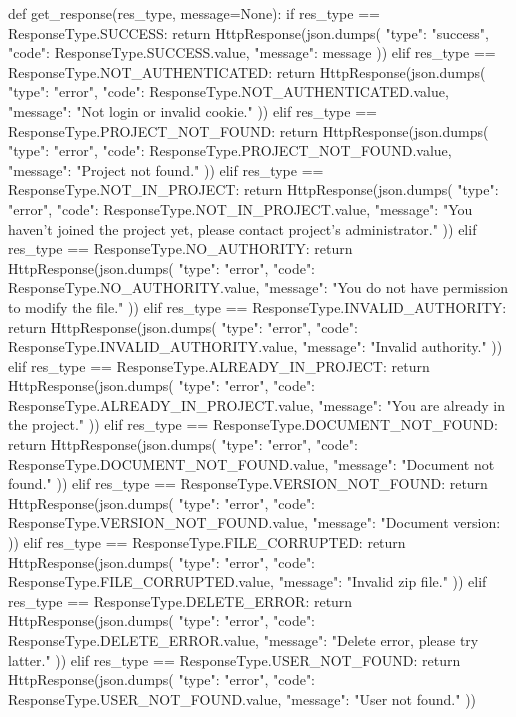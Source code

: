 def get_response(res_type, message=None):
    if res_type == ResponseType.SUCCESS:
        return HttpResponse(json.dumps({
            "type": "success",
            "code": ResponseType.SUCCESS.value,
            "message": message
        }))
    elif res_type == ResponseType.NOT_AUTHENTICATED:
        return HttpResponse(json.dumps({
            "type": "error",
            "code": ResponseType.NOT_AUTHENTICATED.value,
            "message": "Not login or invalid cookie."
        }))
    elif res_type == ResponseType.PROJECT_NOT_FOUND:
        return HttpResponse(json.dumps({
            "type": "error",
            "code": ResponseType.PROJECT_NOT_FOUND.value,
            "message": "Project not found."
        }))
    elif res_type == ResponseType.NOT_IN_PROJECT:
        return HttpResponse(json.dumps({
            "type": "error",
            "code": ResponseType.NOT_IN_PROJECT.value,
            "message": "You haven't joined the project yet, please contact project's administrator."
        }))
    elif res_type == ResponseType.NO_AUTHORITY:
        return HttpResponse(json.dumps({
            "type": "error",
            "code": ResponseType.NO_AUTHORITY.value,
            "message": "You do not have permission to modify the file."
        }))
    elif res_type == ResponseType.INVALID_AUTHORITY:
        return HttpResponse(json.dumps({
            "type": "error",
            "code": ResponseType.INVALID_AUTHORITY.value,
            "message": "Invalid authority."
        }))
    elif res_type == ResponseType.ALREADY_IN_PROJECT:
        return HttpResponse(json.dumps({
            "type": "error",
            "code": ResponseType.ALREADY_IN_PROJECT.value,
            "message": "You are already in the project."
        }))
    elif res_type == ResponseType.DOCUMENT_NOT_FOUND:
        return HttpResponse(json.dumps({
            "type": "error",
            "code": ResponseType.DOCUMENT_NOT_FOUND.value,
            "message": "Document not found."
        }))
    elif res_type == ResponseType.VERSION_NOT_FOUND:
        return HttpResponse(json.dumps({
            "type": "error",
            "code": ResponseType.VERSION_NOT_FOUND.value,
            "message": "Document version: %
        }))
    elif res_type == ResponseType.FILE_CORRUPTED:
        return HttpResponse(json.dumps({
            "type": "error",
            "code": ResponseType.FILE_CORRUPTED.value,
            "message": "Invalid zip file."
        }))
    elif res_type == ResponseType.DELETE_ERROR:
        return HttpResponse(json.dumps({
            "type": "error",
            "code": ResponseType.DELETE_ERROR.value,
            "message": "Delete error, please try latter."
        }))
    elif res_type == ResponseType.USER_NOT_FOUND:
        return HttpResponse(json.dumps({
            "type": "error",
            "code": ResponseType.USER_NOT_FOUND.value,
            "message": "User not found."
        }))


